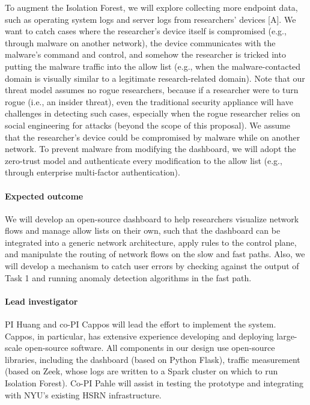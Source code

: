 To augment the Isolation Forest, we will explore collecting more endpoint data, such as operating system logs and server logs from researchers' devices [A]. We want to catch cases where the researcher's device itself is compromised (e.g., through malware on another network), the device communicates with the malware's command and control, and somehow the researcher is tricked into putting the malware traffic into the allow list (e.g., when the malware-contacted domain is visually similar to a legitimate research-related domain). Note that our threat model assumes no rogue researchers, because if a researcher were to turn rogue (i.e., an insider threat), even the traditional security appliance will have challenges in detecting such cases, especially when the rogue researcher relies on social engineering for attacks (beyond the scope of this proposal). We assume that the researcher's device could be compromised by malware while on another network. To prevent malware from modifying the dashboard, we will adopt the zero-trust model and authenticate every modification to the allow list (e.g., through enterprise multi-factor authentication).
















\paragraph{Expected outcome} We will develop an open-source dashboard to help researchers visualize network flows and manage allow lists on their own, such that the dashboard can be integrated into a generic network architecture, apply rules to the control plane, and manipulate the routing of network flows on the slow and fast paths. Also, we will develop a mechanism to catch user errors by checking against the output of Task 1 and running anomaly detection algorithms in the fast path.


\paragraph{Lead investigator} PI Huang and co-PI Cappos will lead the effort to implement the system. Cappos, in particular, has extensive experience developing and deploying large-scale open-source software. All components in our design use open-source libraries, including the dashboard (based on Python Flask), traffic measurement (based on Zeek, whose logs are written to a Spark cluster on which to run Isolation Forest). Co-PI Pahle will assist in testing the prototype and integrating with NYU's existing HSRN infrastructure.
